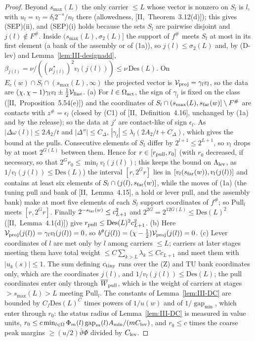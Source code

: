 \documentclass[10pt]{amsart}
\theoremstyle{definition}
\theoremstyle{remark}
\newcommand{\gap}{\operatorname{gap}}
\begin{document}
\begin{proof}
Beyond $s_{\max}(L)$ the only carrier $\le L$ whose vector is nonzero on $S_l$ is
$l$, with $u_l=v_l=\delta_l2^{-s}/n_l$ there (allowedness, [II,~Theorem~3.12(d)]);
this gives (SEP)(ii), and (SEP)(i) holds because the sets $S_l$ are pairwise
disjoint and $j(l)\notin F^\#$.  Inside $(s_{\max}(L),\sigma_2(L)]$ the support of
$f^\#$ meets $S_l$ at most in its first element (a bank of the assembly or of
(1a)), so $j(l)\le\sigma_2(L)$ and, by (D-lev) and Lemma~\ref{lem:III-designadd},
$\beta_{j(l)}=\nu/((\mu^\star_{j(l)})^2v_l(j(l)))\le\nu\,\mathrm{Des}(L)$.  On
$E_c(w)\cap S_l\cap(s_{\max}(L),\infty)$ the projected vector is $\mathcal
V_{\rm proj}=\gamma_lv_l$, so the data are $(\chi,\chi-1)\gamma_lv_l\pm\frac12
\mathcal V_{\rm fine}$.  (a) For $l\in\Omega_{\rm act}$, the sign of $\gamma_l$ is
fixed on the class ([II,~Proposition~5.54(e)]) and the coordinates of $S_l\cap
(s_{\max}(L),s_{\rm far}(w)]\setminus F^\#$ are contacts with $z^\#=\epsilon_l$
(closed by (C1) of [II,~Definition~4.16], unchanged by (1a) and by the release);
so the data at $j'$ are contact-like of sign $\epsilon_l$.  As $|\Delta\omega(l)|
\le2A_2/t$ and $|\Delta''|\le C_\Delta$, $|\gamma_l|\le\lambda_l(2A_2/t+C_\Delta)$,
which gives the bound at the pulls.  Consecutive elements of $S_l$ differ by
$2^{l+1}\le2^{L+1}$, so $v_l$ drops by at most $2^{G(L)}$ between them.  Hence
for $r\in[r_{\rm pull},r_0]$ (with $r_0$ decreased, if necessary, so that
$2^Gr_0\le\min_lv_l(j(l))$; this keeps the bound on $\Lambda_{\rm lev}$, as
$1/v_l(j(l))\le\mathrm{Des}(L)$) the interval $[r,2^Gr]$ lies in
$[v_l(s_{\rm far}(w)),v_l(j(l))]$ and contains at least six elements of
$S_l\cap(j(l),s_{\rm far}(w)]$, while the moves of (1a) (the tuning pull and
bank of [II,~Lemma~4.15], a hold or lever pull, and the assembly bank) make
at most five elements of each $S_l$ support coordinates of $f^\#$; so
$\mathrm{Pull}_l$ meets $[r,2^Gr]$.  Finally $2^{-s_{\rm far}(w)}\le c_{L+1}^2$
and $2^{2G}=2^{12G(L)}\le\mathrm{Des}(L)^2$ ([II,~Lemma~4.1(d)]) give
$r_{\rm pull}\le\mathrm{Des}(L)^2c_{L+1}^2$.  (b) Here
$\mathcal V_{\rm proj}(j(l))=\gamma_lv_l(j(l))=0$, so $b^\theta(j(l))=(\chi-\frac12)
\mathcal V_{\rm proj}(j(l))=0$.  (c) Lever coordinates of $l$ are met only by $l$
among carriers $\le L$; carriers at later stages meeting them have total weight
$\le C\sum_{k>L}\lambda_k\le Cc_{L+1}$ and meet them with $|u_k(s)|\le1$.  The
sum defining $c_{\rm tiny}$ runs over the (Z) and TU bank coordinates only,
which are the coordinates $j(l)$, and $1/v_l(j(l))\le\mathrm{Des}(L)$; the
pull coordinates enter only through $\overline W_{\rm pull}$, which is the
weight of carriers at stages $>s_{\max}(L)>L$ meeting $\mathrm{Pull}_l$.  The constants of Lemma~\ref{lem:III-DC} are
bounded by $C_f\mathrm{Des}(L)^C$ times powers of $1/u(w)$ and of $1/\gap_{\min}$,
which enter through $r_0$: the status radius of Lemma~\ref{lem:III-DC} is measured in
value units, $r_0\le c\min_{l\in\Omega}\Phi_m(l)\gap_m(l)A_{\min}/(mC_{\rm lev})$,
and $r_0\le c$ times the coarse peak margins $\ge(u/2)\bar\vartheta\Phi$ divided by
$C_{\rm lev}$.
\end{proof}
\end{document}
